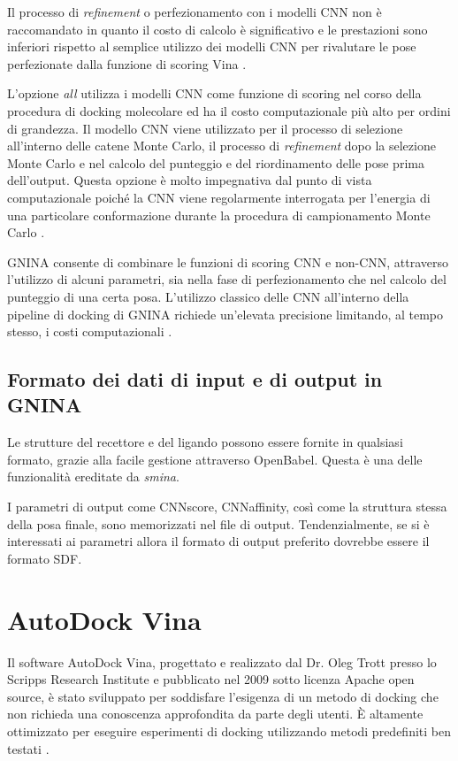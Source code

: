 Il processo di \textit{refinement} o perfezionamento con i modelli CNN non è raccomandato in quanto il costo di calcolo è significativo e le prestazioni sono inferiori rispetto al semplice utilizzo dei modelli CNN per rivalutare le pose perfezionate dalla funzione di scoring Vina \cite{mcnutt_gnina_2021}.

L'opzione \textit{all} utilizza i modelli CNN come funzione di scoring nel corso della procedura di docking molecolare ed ha il costo computazionale più alto per ordini di grandezza. Il modello CNN viene utilizzato per il processo di selezione all'interno delle catene Monte Carlo, il processo di \textit{refinement} dopo la selezione Monte Carlo e nel calcolo del punteggio e del riordinamento delle pose prima dell'output. 
Questa opzione è molto impegnativa dal punto di vista computazionale poiché la CNN viene regolarmente interrogata per l'energia di una particolare conformazione durante la procedura di campionamento Monte Carlo \cite{mcnutt_gnina_2021}. 

GNINA consente di combinare le funzioni di scoring CNN e non-CNN, attraverso l'utilizzo di alcuni parametri, sia nella fase di perfezionamento che nel calcolo del punteggio di una certa posa.
L'utilizzo classico delle CNN all'interno della pipeline di docking di GNINA richiede un'elevata precisione limitando, al tempo stesso, i costi computazionali \cite{mcnutt_gnina_2021}.


\subsection{Formato dei dati di input e di output in GNINA}
Le strutture del recettore e del ligando possono essere fornite in qualsiasi formato, grazie alla facile gestione attraverso OpenBabel. Questa è una delle funzionalità ereditate da \textit{smina}. 

I parametri di output come CNNscore, CNNaffinity, così come la struttura stessa della posa finale, sono memorizzati nel file di output. Tendenzialmente, se si è interessati ai parametri allora il formato di output preferito dovrebbe essere il formato SDF.


\section{AutoDock Vina} 
Il software AutoDock Vina, progettato e realizzato dal Dr. Oleg Trott presso lo Scripps Research Institute e pubblicato nel 2009 sotto licenza Apache open source, è stato sviluppato per soddisfare l'esigenza di un metodo di docking che non richieda una conoscenza approfondita da parte degli utenti. È altamente ottimizzato per eseguire esperimenti di docking utilizzando metodi predefiniti ben testati  \cite{forli_computational_2016, eberhardt_autodock_nodate}. 

